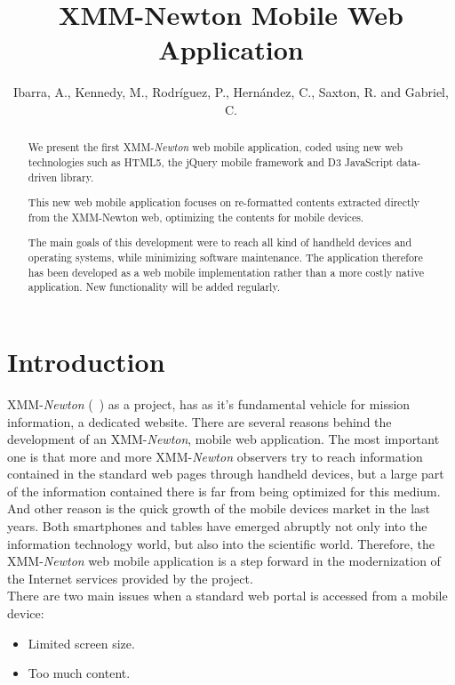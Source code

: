 
\resetcounters




\title{XMM-Newton Mobile Web Application}
\author{Ibarra, A., Kennedy, M., Rodr\'iguez, P., Hern\'andez, C., Saxton, R. and Gabriel, C.}

\begin{abstract}
We present the first XMM-{\em Newton} web mobile application, coded using new web
technologies such as HTML5, the jQuery mobile framework and D3
JavaScript data-driven library.

This new web mobile application focuses on re-formatted contents
extracted directly from the XMM-Newton web, optimizing the contents for
mobile devices. 

The main goals of this development were to reach all kind of handheld
devices and operating systems, while minimizing software
maintenance. The application therefore has been developed as a web mobile
implementation rather than a more costly native application. New
functionality will be added regularly.

\end{abstract}

\section{Introduction}

XMM-{\em Newton} (~\cite{Jansen}) as a project, has as it's fundamental vehicle
for mission information, a dedicated website. There are several
reasons behind the development of an XMM-{\em Newton}, mobile web application. The
most important one is that more and more XMM-{\em Newton} observers try to reach
information contained in the standard web pages through handheld
devices, but a large part of the information contained there is far
from being optimized for this medium. And other reason is the quick
growth of the mobile devices market in the last years.  Both
smartphones and tables have emerged abruptly not only into the
information technology world, but also into the scientific
world. Therefore, the XMM-{\em Newton} web mobile application is a step forward in
the modernization of the Internet services provided by the project.\\
 
There are two main issues when a standard web portal is accessed from a mobile device:
\begin{itemize}
\item Limited screen size.
\item Too much content.
\end{itemize}

